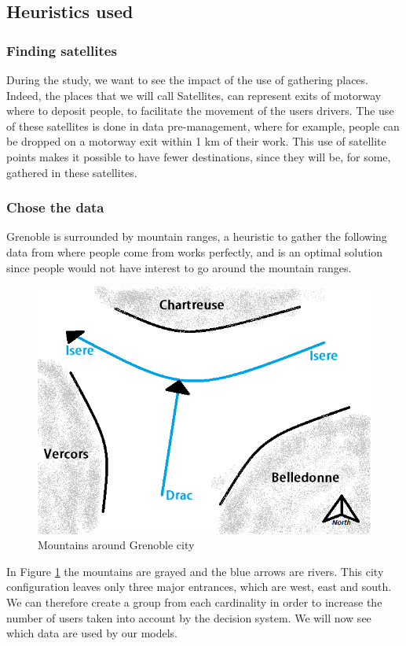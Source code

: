 \documentclass[12pt, a4paper,twoside]{memoir}
\newcommand{\newpar}{\vskip 0.2in \noindent}
\begin{document}
	\subsection{Heuristics used}
	
	\subsubsection{Finding satellites}
	During the study, we want to see the impact of the use of gathering places. Indeed, the places that we will call Satellites, can represent exits of motorway where to deposit people, to facilitate the movement of the users drivers. \newline
	The use of these satellites is done in data pre-management, where for example, people can be dropped on a motorway exit within 1 km of their work.\newline
	This use of satellite points makes it possible to have fewer destinations, since they will be, for some, gathered in these satellites.
	
	\subsubsection{Chose the data}
	
	Grenoble is surrounded by mountain ranges, a heuristic to gather the following data from where people come from works perfectly, and is an optimal solution since people would not have interest to go around the mountain ranges.
	
	\begin{figure}[H]
		\centering
		\begin{flushleft}
			\includegraphics[scale=1]{img/i_grenoble.png}
		\end{flushleft}
		\caption{Mountains around Grenoble city}
		\label{fig:Mountains around Grenoble city}
	\end{figure}
	In Figure \ref{fig:Mountains around Grenoble city} the mountains are grayed and the blue arrows are rivers. This city configuration leaves only three major entrances, which are west, east and south. We can therefore create a group from each cardinality in order to increase the number of users taken into account by the decision system.
	\newpar
	We will now see which data are used by our models. 
\end{document}
